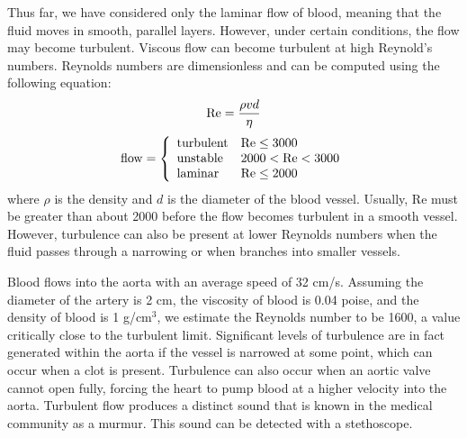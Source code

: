 Thus far, we have considered only the laminar flow of blood, meaning that the fluid moves in smooth, parallel layers.  However, under certain conditions, the flow may become turbulent.  Viscous flow can become turbulent at high Reynold’s numbers.  Reynolds numbers are dimensionless and can be computed using the following equation:
\begin{equation}\label{eqn2-9}
{\rm Re} = \frac{\rho v d}{\eta}
\end{equation}
\[   {\rm flow} = \left\{
\begin{array}{ll}
      {\rm turbulent} & {\rm Re}\leq 3000 \\          
      {\rm unstable} & 2000 < {\rm Re} < 3000 \\
      {\rm laminar} & {\rm Re}\leq 2000 \\
\end{array} 
\right. \]
where $\rho$ is the density and $d$ is the diameter of the blood vessel.  Usually, Re must be greater than about 2000 before the flow becomes turbulent in a smooth vessel. However, turbulence can also be present at lower Reynolds numbers when the fluid passes through a narrowing or when branches into smaller vessels.

Blood flows into the aorta with an average speed of 32 cm/s.  Assuming the diameter of the artery is 2 cm, the viscosity of blood is 0.04 poise, and the density of blood is 1 g/cm$^3$, we estimate the Reynolds number to be 1600, a value critically close to the turbulent limit. Significant levels of turbulence are in fact generated within the aorta if the vessel is narrowed at some point, which can occur when a clot is present. Turbulence can also occur when an aortic valve cannot open fully, forcing the heart to pump blood at a higher velocity into the aorta. Turbulent flow produces a distinct sound that is known in the medical community as a murmur. This sound can be detected with a stethoscope.